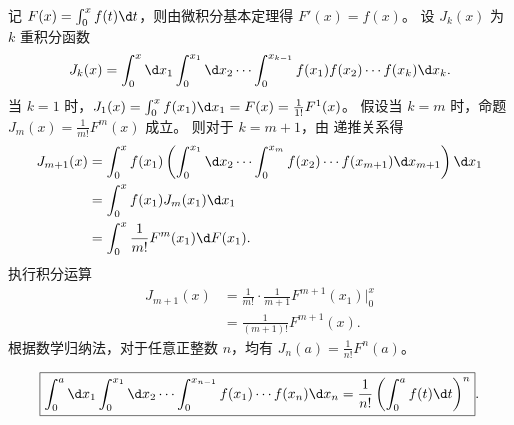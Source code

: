 \begin{myproof}
    记 $F(x) = \int_{0}^{x} f(t) \d t$，则由微积分基本定理得 $F'(x) = f(x)$。
    设 $J_k(x)$ 为 $k$ 重积分函数
    \begin{equation}
        J_k(x) = \int_{0}^{x} \d x_{1} \int_{0}^{x_{1}} \d x_{2} \cdots \int_{0}^{x_{k-1}} f(x_{1}) f(x_{2}) \cdots f(x_{k}) \d x_{k}. \label{eq:integral-def}
    \end{equation}
    当 $k=1$ 时，$J_1(x) = \int_{0}^{x} f(x_1) \d x_1 = F(x) = \frac{1}{1!} F^1(x)$。
    假设当 $k=m$ 时，命题 $J_m(x) = \frac{1}{m!} F^m(x)$ 成立。
    则对于 $k=m+1$，由  递推关系得
    \begin{equation}
        \begin{aligned}
            J_{m+1}(x) & = \int_{0}^{x} f(x_1) \left( \int_{0}^{x_1} \d x_2 \cdots \int_{0}^{x_{m}} f(x_2) \cdots f(x_{m+1}) \d x_{m+1} \right) \d x_1 \\
                       & = \int_{0}^{x} f(x_1) J_m(x_1) \d x_1                                                                                         \\
                       & = \int_{0}^{x} \frac{1}{m!} F^m(x_1) \d F(x_1).
        \end{aligned}
    \end{equation}
    执行积分运算
    \begin{equation}
        \begin{aligned}
            J_{m+1}(x) & = \frac{1}{m!} \cdot \frac{1}{m+1} F^{m+1}(x_1) \bigg|_{0}^{x} \\
                       & = \frac{1}{(m+1)!} F^{m+1}(x).
        \end{aligned}
    \end{equation}
    根据数学归纳法，对于任意正整数 $n$，均有 $J_n(a) = \frac{1}{n!} F^n(a)$。

    \begin{equation}
        \boxed{\int_{0}^{a} \d x_{1} \int_{0}^{x_{1}} \d x_{2} \cdots \int_{0}^{x_{n-1}} f(x_{1}) \cdots f(x_{n}) \d x_{n} = \frac{1}{n!} \left( \int_{0}^{a} f(t) \d t \right)^{n}}.
    \end{equation}
\end{myproof}


\endinput
